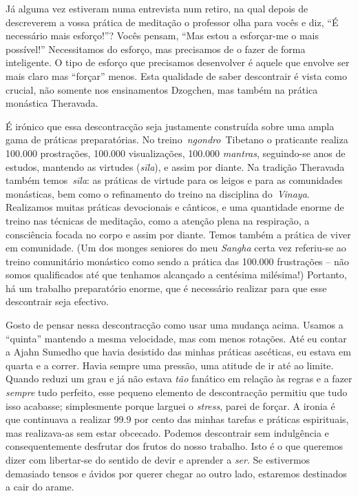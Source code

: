 Já alguma vez estiveram numa entrevista num retiro, na qual depois de
descreverem a vossa prática de meditação o professor olha para vocês e
diz, ``É necessário mais esforço!''? Vocês pensam, ``Mas estou a
esforçar-me o mais possível!'' Necessitamos do esforço, mas precisamos
de o fazer de forma inteligente. O tipo de esforço que precisamos
desenvolver é aquele que envolve ser mais claro mas ``forçar'' menos.
Esta qualidade de saber descontrair é vista como crucial, não somente
nos ensinamentos Dzogchen, mas também na prática monástica Theravada.

É irónico que essa descontracção seja justamente construída sobre uma
ampla gama de práticas preparatórias. No treino~\emph{ngondro}~Tibetano
o praticante realiza 100.000 prostrações, 100.000 visualizações, 100.000
\emph{mantras}, seguindo-se anos de estudos, mantendo as virtudes
(\emph{sīla}), e assim por diante. Na tradição Theravada também
temos~\emph{sīla}: as práticas de virtude para os leigos e para as
comunidades monásticas, bem como o refinamento do treino na disciplina
do~\emph{Vinaya}. Realizamos muitas práticas devocionais e cânticos, e
uma quantidade enorme de treino nas técnicas de meditação, como a
atenção plena na respiração, a consciência focada no corpo e assim por
diante. Temos também a prática de viver em comunidade. (Um dos monges
seniores do meu \emph{Sangha} certa vez referiu-se ao treino comunitário
monástico como sendo a prática das 100.000 frustrações -- não somos
qualificados até que tenhamos alcançado a centésima milésima!) Portanto,
há um trabalho preparatório enorme, que é necessário realizar para que
esse descontrair seja efectivo.

Gosto de pensar nessa descontracção como usar uma mudança acima. Usamos
a ``quinta'' mantendo a mesma velocidade, mas com menos rotações. Até eu
contar a Ajahn Sumedho que havia desistido das minhas práticas
ascéticas, eu estava em quarta e a correr. Havia sempre uma pressão, uma
atitude de ir até ao limite. Quando reduzi um grau e já não estava
\emph{tão} fanático em relação às regras e a fazer \emph{sempre} tudo
perfeito, esse pequeno elemento de descontracção permitiu que tudo isso
acabasse; simplesmente porque larguei o \emph{stress}, parei de forçar.
A ironia é que continuava a realizar 99.9 por cento das minhas tarefas e
práticas espirituais, mas realizava-as sem estar obcecado. Podemos
descontrair sem indulgência e consequentemente desfrutar dos frutos do
nosso trabalho. Isto é o que queremos dizer com libertar-se do sentido
de devir e aprender a \emph{ser}. Se estivermos demasiado tensos e
ávidos por querer chegar ao outro lado, estaremos destinados a cair do
arame.

